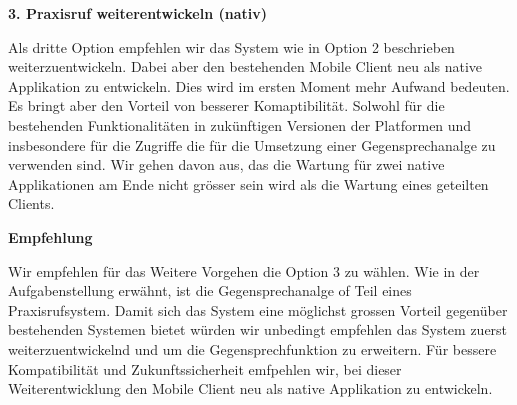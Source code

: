 \clearpage
\textbf{3. Praxisruf weiterentwickeln (nativ) }

Als dritte Option empfehlen wir das System wie in Option 2 beschrieben weiterzuentwickeln.
Dabei aber den bestehenden Mobile Client neu als native Applikation zu entwickeln.
Dies wird im ersten Moment mehr Aufwand bedeuten.
Es bringt aber den Vorteil von besserer Komaptibilität.
Solwohl für die bestehenden Funktionalitäten in zukünftigen Versionen der Platformen und insbesondere für die Zugriffe die für die Umsetzung einer Gegensprechanalge zu verwenden sind.
Wir gehen davon aus, das die Wartung für zwei native Applikationen am Ende nicht grösser sein wird als die Wartung eines geteilten Clients.

\textbf{Empfehlung}

Wir empfehlen für das Weitere Vorgehen die Option 3 zu wählen.
Wie in der Aufgabenstellung erwähnt, ist die Gegensprechanalge of Teil eines Praxisrufsystem.
Damit sich das System eine möglichst grossen Vorteil gegenüber bestehenden Systemen bietet würden wir unbedingt empfehlen das System zuerst weiterzuentwickelnd und um die Gegensprechfunktion zu erweitern.
Für bessere Kompatibilität und Zukunftssicherheit emfpehlen wir, bei dieser Weiterentwicklung den Mobile Client neu als native Applikation zu entwickeln.

\clearpage
